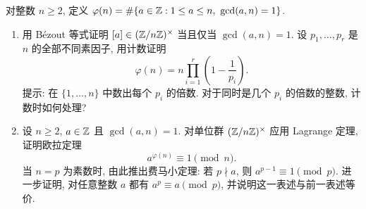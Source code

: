 \documentclass{article}
\begin{document}
\begin{problem}
对整数 $n\ge2$, 定义 $\varphi(n)=\#\{a\in\Z:1\le a\le n,\ \gcd(a,n)=1\}$.
\begin{enumerate}
  \item[(a)] 用 Bézout 等式证明 $[a]\in(\mathbb{Z}/n\mathbb{Z})^\times$ 当且仅当 $\gcd(a,n)=1$. 设 $p_1,\ldots,p_r$ 是 $n$ 的全部不同素因子, 用计数证明
  \[
    \varphi(n)=n\prod_{i=1}^r\left(1-\frac1{p_i}\right).
  \]
  提示: 在 $\{1,\ldots,n\}$ 中数出每个 $p_i$ 的倍数. 对于同时是几个 $p_i$ 的倍数的整数, 计数时如何处理?
  \item[(b)] 设 $n\ge2$, $a\in\mathbb{Z}$ 且 $\gcd(a,n)=1$. 对单位群 $(\mathbb{Z}/n\mathbb{Z})^\times$ 应用 Lagrange 定理, 证明欧拉定理
  \[
    a^{\varphi(n)}\equiv1\pmod n.
  \]
  当 $n=p$ 为素数时, 由此推出费马小定理: 若 $p\nmid a$, 则 $a^{p-1}\equiv1\pmod p$. 进一步证明, 对任意整数 $a$ 都有 $a^p\equiv a\pmod p$, 并说明这一表述与前一表述等价.
\end{enumerate}
\end{problem}
\end{document}
